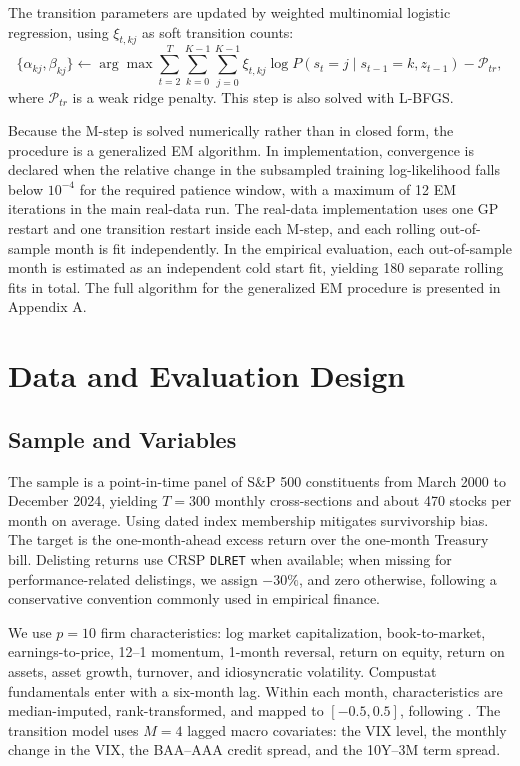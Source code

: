 \documentclass[11pt]{article}
\begin{document}
The transition parameters are updated by weighted multinomial logistic regression, using \(\xi_{t,kj}\) as soft transition counts:
\[
\{\alpha_{kj},\beta_{kj}\}
\leftarrow
\arg\max
\sum_{t=2}^{T}
\sum_{k=0}^{K-1}
\sum_{j=0}^{K-1}
\xi_{t,kj}
\log
P(s_t=j\mid s_{t-1}=k,z_{t-1})
-
\mathcal{P}_{tr},
\]
where \(\mathcal{P}_{tr}\) is a weak ridge penalty. This step is also solved with L-BFGS.

Because the M-step is solved numerically rather than in closed form, the procedure is a generalized EM algorithm. In implementation, convergence is declared when the relative change in the subsampled training log-likelihood falls below \(10^{-4}\) for the required patience window, with a maximum of 12 EM iterations in the main real-data run. The real-data implementation uses one GP restart and one transition restart inside each M-step, and each rolling out-of-sample month is fit independently. In the empirical evaluation, each out-of-sample month is estimated as an independent cold start fit, yielding 180 separate rolling fits in total. The full algorithm for the generalized EM procedure is presented in Appendix A.

\section{Data and Evaluation Design}

\subsection{Sample and Variables}
The sample is a point-in-time panel of S\&P 500 constituents from March 2000 to December 2024, yielding \(T=300\) monthly cross-sections and about 470 stocks per month on average. Using dated index membership mitigates survivorship bias. The target is the one-month-ahead excess return over the one-month Treasury bill. Delisting returns use CRSP \texttt{DLRET} when available; when missing for performance-related delistings, we assign \(-30\%\), and zero otherwise, following a conservative convention commonly used in empirical finance.

We use \(p=10\) firm characteristics: log market capitalization, book-to-market, earnings-to-price, 12--1 momentum, 1-month reversal, return on equity, return on assets, asset growth, turnover, and idiosyncratic volatility. Compustat fundamentals enter with a six-month lag. Within each month, characteristics are median-imputed, rank-transformed, and mapped to \([-0.5,0.5]\), following \citet{gu_empirical_2020}. The transition model uses \(M=4\) lagged macro covariates: the VIX level, the monthly change in the VIX, the BAA--AAA credit spread, and the 10Y--3M term spread.
\end{document}
